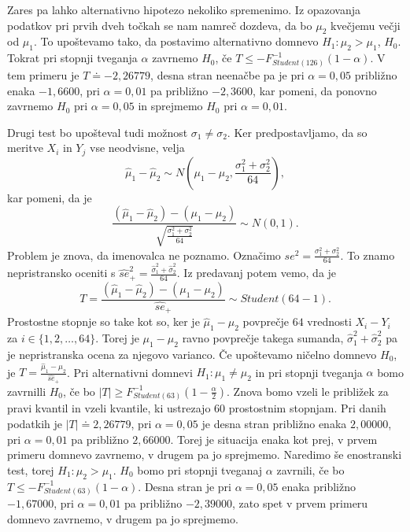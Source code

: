 \documentclass[12pt, letterpaper]{article}
\begin{document}
Zares pa lahko alternativno hipotezo nekoliko spremenimo. Iz opazovanja podatkov pri prvih dveh točkah se nam namreč dozdeva, da bo $\mu_2$ kvečjemu večji od $\mu_1$. To upoštevamo tako, da postavimo alternativno domnevo $H_1 : \mu_2 > \mu_1$, $H_0$. Tokrat pri stopnji tveganja $\alpha$ zavrnemo $H_0$, če $T \leq -F^{-1}_{Student(126)}(1 - \alpha)$. V tem primeru je $T \doteq -2,26779$, desna stran neenačbe pa je pri $\alpha = 0,05$ približno enaka $-1,6600$, pri $\alpha = 0,01$ pa približno $-2,3600$, kar pomeni, da ponovno zavrnemo $H_0$ pri $\alpha = 0,05$ in sprejmemo $H_0$ pri $\alpha = 0,01$.

Drugi test bo upošteval tudi možnost $\sigma_1 \neq \sigma_2$. Ker predpostavljamo, da so meritve $X_i$ in $Y_j$ vse neodvisne, velja
\[
\hat{\mu}_1 - \hat{\mu}_2 \sim N\left(\mu_1 - \mu_2, \frac{\sigma_1^2 + \sigma_2^2}{64}\right),
\]
kar pomeni, da je
\[
\frac{(\hat{\mu}_1 - \hat{\mu}_2) - (\mu_1 - \mu_2)}{\sqrt{\frac{\sigma_1^2 + \sigma_2^2}{64}}} \sim N(0,1).
\]
Problem je znova, da imenovalca ne poznamo. Označimo $se^2 = \frac{\sigma_1^2 + \sigma_2^2}{64}$. To znamo nepristransko oceniti s $\hat{se}_+^2 = \frac{\hat{\sigma}_1^2 +  \hat{\sigma}_2^2}{64}$. Iz predavanj potem vemo, da je
\[
T = \frac{(\hat{\mu}_1 - \hat{\mu}_2) - (\mu_1 - \mu_2)}{\hat{se}_+} \sim Student(64 - 1).
\]
Prostostne stopnje so take kot so, ker je $\hat{\mu}_1 - \hat{\mu}_2$ povprečje $64$ vrednosti $X_i - Y_i$ za $i \in \{1,2,\ldots,64\}$. Torej je $\mu_1 - \mu_2$ ravno povprečje takega sumanda, $\hat{\sigma}_1^2 +  \hat{\sigma}_2^2$ pa je nepristranska ocena za njegovo varianco. Če upoštevamo ničelno domnevo $H_0$, je $T = \frac{\hat{\mu}_1 - \hat{\mu}_2}{\hat{se}_+}$. Pri alternativni domnevi $H_1 : \mu_1 \neq \mu_2$ in pri stopnji tveganja $\alpha$ bomo zavrnilli $H_0$, če bo $|T| \geq F^{-1}_{Student(63)}(1 - \frac{\alpha}{2})$. Znova bomo vzeli le približek za pravi kvantil in vzeli kvantile, ki ustrezajo $60$ prostostnim stopnjam. Pri danih podatkih je $|T| \doteq 2,26779$, pri $\alpha = 0,05$ je desna stran približno enaka $2,00000$, pri $\alpha = 0,01$ pa približno $2,66000$. Torej je situacija enaka kot prej, v prvem primeru domnevo zavrnemo, v drugem pa jo sprejmemo. Naredimo še enostranski test, torej $H_1 : \mu_2 > \mu_1$. $H_0$ bomo pri stopnji tveganaj $\alpha$ zavrnili, če bo $T \leq -F^{-1}_{Student(63)}(1 - \alpha)$. Desna stran je pri $\alpha = 0,05$ enaka približno $-1,67000$, pri $\alpha = 0,01$ pa približno $-2,39000$, zato spet v prvem primeru domnevo zavrnemo, v drugem pa jo sprejmemo.
\end{document}
